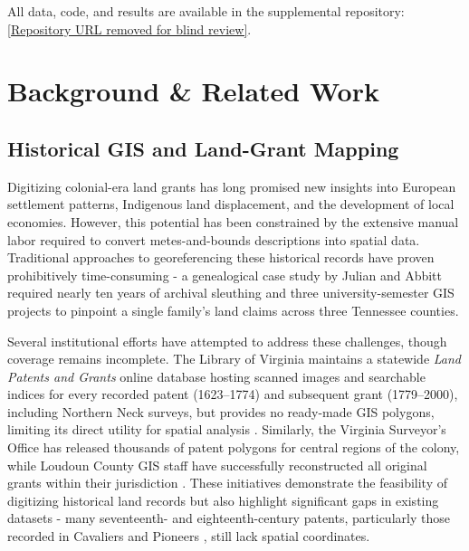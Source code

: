 All data, code, and results are available in the supplemental
repository:
\url{[Repository URL removed for blind review]}.

\section{Background \& Related Work}\label{background-related-work}

\subsection{Historical GIS and Land-Grant
Mapping}\label{historical-gis-and-land-grant-mapping}

Digitizing colonial-era land grants has long promised new insights into
European settlement patterns, Indigenous land displacement, and the
development of local economies. However, this potential has been
constrained by the extensive manual labor required to convert
metes-and-bounds descriptions into spatial data. Traditional approaches
to georeferencing these historical records have proven prohibitively
time-consuming - a genealogical case study by Julian and Abbitt
\citep{Julian2014_tennessee} required nearly ten years of archival
sleuthing and three university-semester GIS projects to pinpoint a
single family's land claims across three Tennessee counties.

Several institutional efforts have attempted to address these
challenges, though coverage remains incomplete. The Library of Virginia
maintains a statewide \emph{Land Patents and Grants} online database
hosting scanned images and searchable indices for every recorded patent
(1623--1774) and subsequent grant (1779--2000), including Northern Neck
surveys, but provides no ready-made GIS polygons, limiting its direct
utility for spatial analysis \citep{lva_patents_db}. Similarly, the
Virginia Surveyor's Office has released thousands of patent polygons for
central regions of the colony, while Loudoun County GIS staff have
successfully reconstructed all original grants within their jurisdiction
\citep{loudoun_grants_dataset}. These initiatives demonstrate the
feasibility of digitizing historical land records but also highlight
significant gaps in existing datasets - many seventeenth- and
eighteenth-century patents, particularly those recorded in Cavaliers and
Pioneers \citep{Nugent1979_cavaliers3}, still lack spatial coordinates.


